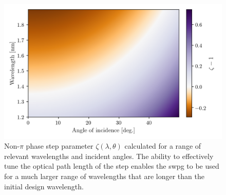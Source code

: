\begin{figure}
	\centering
	\includegraphics[width=1.0\textwidth]{figures/Two_source/zeta_theta.png}
	\caption{Non-$\pi$ phase step parameter $\zeta(\lambda,\theta)$ calculated for a range of relevant wavelengths and incident angles.  The ability to effectively tune the optical path length of the step enables the \gls{swpg} to be used for a much larger range of wavelengths that are longer than the initial design wavelength.}
	\label{fig:zeta_theta}
\end{figure}

